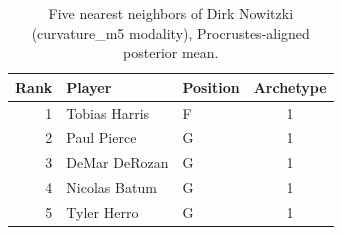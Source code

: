 \begin{table}[htbp]
  \centering\small
  \begin{tabular}{rllc}
    \toprule
    Rank & Player & Position & Archetype \\
    \midrule
    1 & Tobias Harris & F & 1 \\
    2 & Paul Pierce & G & 1 \\
    3 & DeMar DeRozan & G & 1 \\
    4 & Nicolas Batum & G & 1 \\
    5 & Tyler Herro & G & 1 \\
    \bottomrule
  \end{tabular}
  \caption{Five nearest neighbors of Dirk Nowitzki (curvature_m5 modality), Procrustes-aligned posterior mean.}
  \label{tab:Dirk_Nowitzki_neighbors_curvature_m5}
\end{table}

